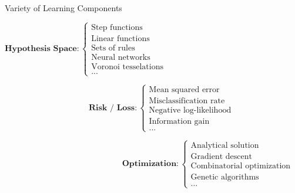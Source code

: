 \documentclass[11pt,compress,t,notes=noshow, xcolor=table]{beamer}
\begin{document}

\begin{frame}[squeeze]{Variety of Learning Components}


\begin{footnotesize}

$\textbf{Hypothesis Space}: \begin{cases} 

\text{Step functions} \\
\text{Linear functions}\\
\text{Sets of rules}\\
\text{Neural networks}\\
\text{Voronoi tesselations}\\
\text{...}
\end{cases}$

$\phantom{Hypothesis Space RISK } \textbf{Risk / Loss}: \begin{cases}
\text{Mean squared error}\\
\text{Misclassification rate}\\
\text{Negative log-likelihood}\\
\text{Information gain}\\
\text{...}
\end{cases}$

$\phantom{hypothesis space risk RISK RISK} \textbf{Optimization}: \begin{cases}
\text{Analytical solution}\\
\text{Gradient descent}\\
\text{Combinatorial optimization}\\
\text{Genetic algorithms}\\
\text{...}
\end{cases}$

\end{footnotesize}
\end{frame}

\end{document}
